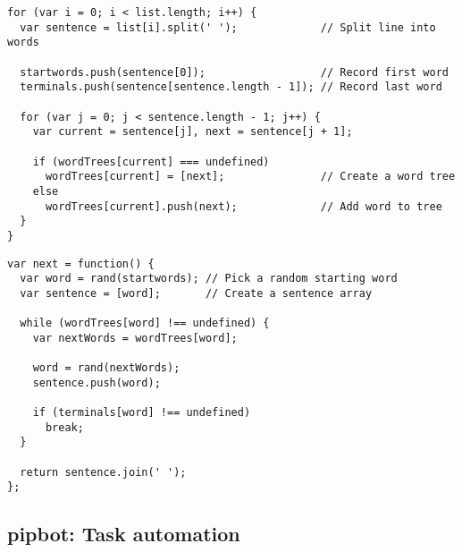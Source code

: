 \lstset{language=JavaScript}
\begin{lstlisting}[label=lst:markov-chain,caption={%
      [Markov chain implementation]
      Markov chain implementation in JavaScript.}]
for (var i = 0; i < list.length; i++) {
  var sentence = list[i].split(' ');             // Split line into words

  startwords.push(sentence[0]);                  // Record first word
  terminals.push(sentence[sentence.length - 1]); // Record last word

  for (var j = 0; j < sentence.length - 1; j++) {
    var current = sentence[j], next = sentence[j + 1];

    if (wordTrees[current] === undefined)
      wordTrees[current] = [next];               // Create a word tree
    else
      wordTrees[current].push(next);             // Add word to tree
  }
}
\end{lstlisting}


\lstset{language=JavaScript}
\begin{lstlisting}[label=lst:markov-text-generator,caption={%
      [Markov text generator]
      Markov text generator implementation.}]
var next = function() {
  var word = rand(startwords); // Pick a random starting word
  var sentence = [word];       // Create a sentence array

  while (wordTrees[word] !== undefined) {
    var nextWords = wordTrees[word];

    word = rand(nextWords);
    sentence.push(word);

    if (terminals[word] !== undefined)
      break;
  }

  return sentence.join(' ');
};
\end{lstlisting}


\newpage
\subsection{pipbot: Task automation}\label{subsec:pipbot}


